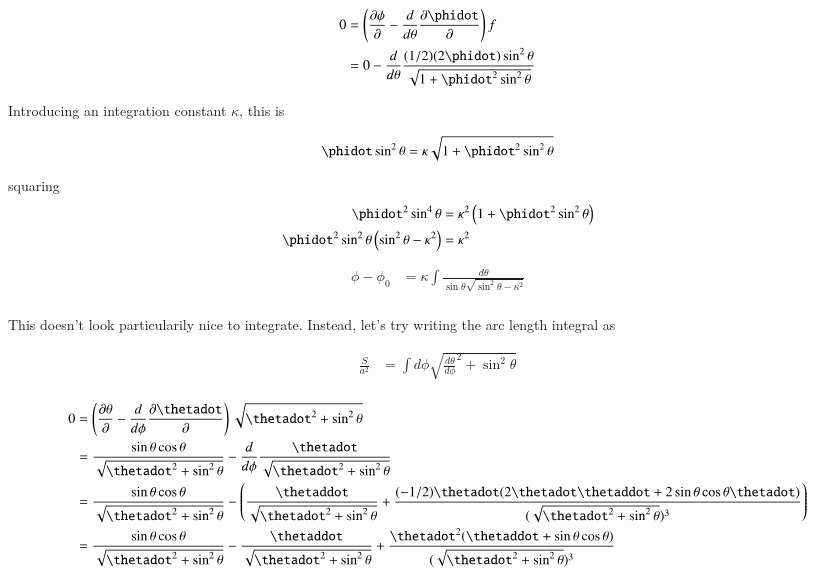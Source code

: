 \documentclass{article}
\begin{document}
\begin{align*}
0 
&= \left( \PD{\phi}{} - \frac{d}{d\theta} \PD{\phidot}{} \right) f \\
&= 0 - \frac{d}{d\theta} \frac{(1/2)(2\phidot) \sin^2\theta}{\sqrt{1 + \phidot^2 \sin^2\theta}} \\
\end{align*}

Introducing an integration constant $\kappa$, this is

\begin{align*}
\phidot \sin^2\theta = \kappa \sqrt{1 + \phidot^2 \sin^2\theta}
\end{align*}

squaring
\begin{align*}
\phidot^2 \sin^4\theta &= \kappa^2 \left(1 + \phidot^2 \sin^2\theta \right) \\
\phidot^2 \sin^2\theta \left( \sin^2 \theta - \kappa^2 \right) &= \kappa^2 \\
\end{align*}

\begin{align*}
\phi - \phi_0 &= \kappa \int \frac{d\theta}{\sin\theta \sqrt{ \sin^2 \theta - \kappa^2 }} \\
\end{align*}

This doesn't look particularily nice to integrate.  Instead, let's try writing the arc length integral as

\begin{align*}
\frac{S}{a^2} &= \int d\phi \sqrt{{\frac{d\theta}{d\phi}}^2 + \sin^2\theta } \\
\end{align*}

\begin{align*}
0 
&= \left( \PD{\theta}{} - \frac{d}{d\phi} \PD{\thetadot}{} \right) \sqrt{\thetadot^2 + \sin^2\theta } \\
&= \frac{\sin\theta \cos\theta}{ \sqrt{\thetadot^2 + \sin^2\theta } } -
\frac{d}{d\phi} \frac{\thetadot} { \sqrt{\thetadot^2 + \sin^2\theta } } \\
&= \frac{\sin\theta \cos\theta}{ \sqrt{\thetadot^2 + \sin^2\theta } } -
\left(
\frac{\thetaddot} { \sqrt{\thetadot^2 + \sin^2\theta } } 
+ \frac{(-1/2)\thetadot(2 \thetadot \thetaddot + 2 \sin\theta\cos\theta \thetadot)} { (\sqrt{\thetadot^2 + \sin^2\theta })^3 } 
\right) \\
&= \frac{\sin\theta \cos\theta}{ \sqrt{\thetadot^2 + \sin^2\theta } } 
- \frac{\thetaddot} { \sqrt{\thetadot^2 + \sin^2\theta } } 
+ \frac{\thetadot^2( \thetaddot + \sin\theta\cos\theta )} { (\sqrt{\thetadot^2 + \sin^2\theta })^3 } 
\\
\end{align*}
\end{document}
